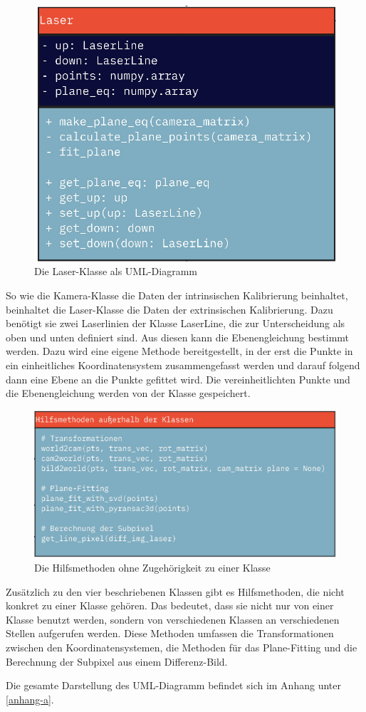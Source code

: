		\begin{figure}[h]
			\centering
			\includegraphics[width=0.35\linewidth]{img/hauptteil/software/Laser_UML.png}
			\caption{Die Laser-Klasse als UML-Diagramm}
			\label{fig:laser_uml}
		\end{figure}
		So wie die Kamera-Klasse die Daten der intrinsischen Kalibrierung beinhaltet, beinhaltet die Laser-Klasse die Daten der extrinsischen Kalibrierung. Dazu benötigt sie zwei Laserlinien der Klasse LaserLine, die zur Unterscheidung als \glqq oben\grqq{} und \glqq unten\grqq{} definiert sind. Aus diesen kann die Ebenengleichung bestimmt werden. Dazu wird eine eigene Methode bereitgestellt, in der erst die Punkte in ein einheitliches Koordinatensystem zusammengefasst werden und darauf folgend dann eine Ebene an die Punkte gefittet wird. Die vereinheitlichten Punkte und die Ebenengleichung werden von der Klasse gespeichert.
		\newpage
		\begin{figure}[h]
			\centering
			\includegraphics[width=0.7\linewidth]{img/hauptteil/software/Hilfsmethoden_UML.png}
			\caption{Die Hilfsmethoden ohne Zugehörigkeit zu einer Klasse}
			\label{fig:hilfsmethoden_uml}
		\end{figure}
		Zusätzlich zu den vier beschriebenen Klassen gibt es Hilfsmethoden, die nicht konkret zu einer Klasse gehören. Das bedeutet, dass sie nicht nur von einer Klasse benutzt werden, sondern von verschiedenen Klassen an verschiedenen Stellen aufgerufen werden. Diese Methoden umfassen die Transformationen zwischen den Koordinatensystemen, die Methoden für das Plane-Fitting und die Berechnung der Subpixel aus einem Differenz-Bild.
		
		Die gesamte Darstellung des UML-Diagramm befindet sich im Anhang unter \ref{anhang-a}.
		

